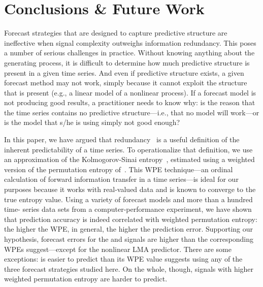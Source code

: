 \section{ Conclusions \& Future Work }\label{sec:conc}

Forecast strategies that are designed to capture predictive structure
are ineffective when signal complexity outweighs information
redundancy.  This poses a number of serious challenges in practice.
Without knowing anything about the generating process, it is difficult
to determine how much predictive structure is present in a given time
series.  And even if predictive structure exists, a given forecast
method may not work, simply because it cannot exploit the structure
that is present (e.g., a linear model of a nonlinear process).  If a
forecast model is not producing good results, a practitioner needs to
know why: is the reason that the time series contains no predictive
structure---i.e., that no model will work---or is the model that s/he
is using simply not good enough?

In this paper, we have argued that redundancy~\cite{crutchfield2003} is a useful
definition of the inherent predictability of a time series.  To operationalize
that definition, we use an approximation of the Kolmogorov-Sinai
entropy~\cite{lind95}, estimated using a weighted version of the permutation
entropy of~\cite{bandt2002per}.  This WPE technique---an ordinal calculation of
forward information transfer in a time series---is ideal for our purposes
because it works with real-valued data and is known to converge to the true
entropy value. Using a variety of forecast models and more than a hundred time-
series data sets from a computer-performance experiment, we have shown that
prediction accuracy is indeed correlated with weighted permutation entropy: the
higher the WPE, in general, the higher the prediction error.  Supporting our
hypothesis, forecast errors for the \col and \svdfive signals are higher than
the corresponding WPEs suggest---except for the nonlinear LMA predictor.  There
are some exceptions: \svdone is easier to predict than its WPE value suggests
using any of the three forecast strategies studied here.  On the whole, though,
signals with higher weighted permutation entropy are harder to predict.


